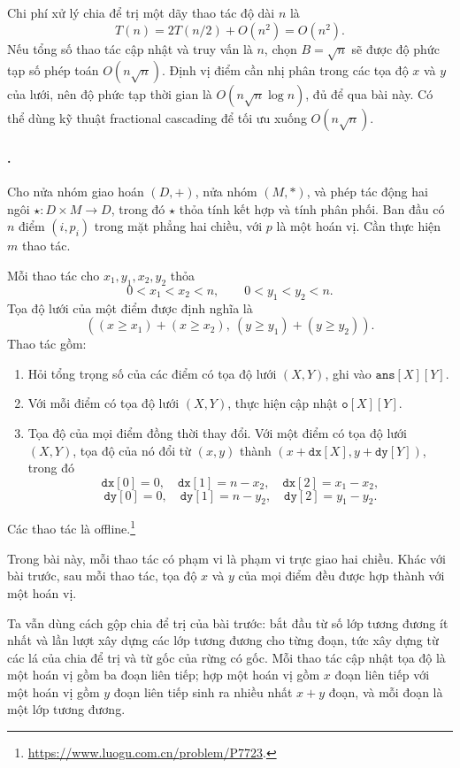 \documentclass[11pt]{article}
\begin{document}
Chi phí xử lý chia để trị một dãy thao tác độ dài \(n\) là
\[
  T(n)=2T(n/2)+O(n^2)=O(n^2).
\]
Nếu tổng số thao tác cập nhật và truy vấn là \(n\), chọn \(B=\sqrt n\) sẽ được
độ phức tạp số phép toán \(O(n\sqrt n)\). Định vị điểm cần nhị phân trong các
tọa độ \(x\) và \(y\) của lưới, nên độ phức tạp thời gian là
\(O(n\sqrt n\log n)\), đủ để qua bài này. Có thể dùng kỹ thuật fractional
cascading để tối ưu xuống \(O(n\sqrt n)\).

\paragraph{.}

Cho nửa nhóm giao hoán \((D,+)\), nửa nhóm \((M,*)\), và phép tác động hai ngôi
\(\star:D\times M\to D\), trong đó \(\star\) thỏa tính kết hợp và tính phân
phối. Ban đầu có \(n\) điểm \((i,p_i)\) trong mặt phẳng hai chiều, với \(p\) là
một hoán vị. Cần thực hiện \(m\) thao tác.

Mỗi thao tác cho \(x_1,y_1,x_2,y_2\) thỏa
\[
  0<x_1<x_2<n,\qquad 0<y_1<y_2<n.
\]
Tọa độ lưới của một điểm được định nghĩa là
\[
  ((x\ge x_1)+(x\ge x_2),\ (y\ge y_1)+(y\ge y_2)).
\]
Thao tác gồm:
\begin{enumerate}
  \item Hỏi tổng trọng số của các điểm có tọa độ lưới \((X,Y)\), ghi vào
  \(\mathtt{ans}[X][Y]\).
  \item Với mỗi điểm có tọa độ lưới \((X,Y)\), thực hiện cập nhật
  \(\mathtt{o}[X][Y]\).
  \item Tọa độ của mọi điểm đồng thời thay đổi. Với một điểm có tọa độ lưới
  \((X,Y)\), tọa độ của nó đổi từ \((x,y)\) thành
  \((x+\mathtt{dx}[X], y+\mathtt{dy}[Y])\), trong đó
  \[
    \mathtt{dx}[0]=0,\quad
    \mathtt{dx}[1]=n-x_2,\quad
    \mathtt{dx}[2]=x_1-x_2,
  \]
  \[
    \mathtt{dy}[0]=0,\quad
    \mathtt{dy}[1]=n-y_2,\quad
    \mathtt{dy}[2]=y_1-y_2.
  \]
\end{enumerate}
Các thao tác là offline.\footnote{\url{https://www.luogu.com.cn/problem/P7723}.}

Trong bài này, mỗi thao tác có phạm vi là phạm vi trực giao hai chiều. Khác với
bài trước, sau mỗi thao tác, tọa độ \(x\) và \(y\) của mọi điểm đều được hợp
thành với một hoán vị.

Ta vẫn dùng cách gộp chia để trị của bài trước: bắt đầu từ số lớp tương đương
ít nhất và lần lượt xây dựng các lớp tương đương cho từng đoạn, tức xây dựng
từ các lá của chia để trị và từ gốc của rừng có gốc. Mỗi thao tác cập nhật tọa
độ là một hoán vị gồm ba đoạn liên tiếp; hợp một hoán vị gồm \(x\) đoạn liên
tiếp với một hoán vị gồm \(y\) đoạn liên tiếp sinh ra nhiều nhất \(x+y\) đoạn,
và mỗi đoạn là một lớp tương đương.
\end{document}
